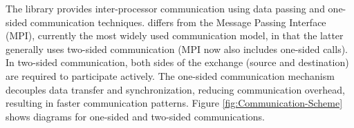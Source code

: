 The \openshmem library provides inter-processor communication using data
passing and one-sided communication techniques. \openshmem differs from
the Message Passing Interface (MPI), currently the most widely used
communication model, in that the latter generally uses two-sided communication
(MPI now also includes one-sided calls). In two-sided communication,
both sides of the exchange (source and destination) are required to
participate actively. The one-sided communication mechanism decouples
data transfer and synchronization, reducing communication overhead,
resulting in faster communication patterns. Figure \ref{fig:Communication-Scheme}
shows diagrams for one-sided and two-sided communications.\medskip{}


%
%

